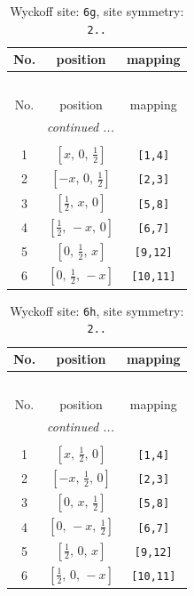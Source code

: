 \documentclass[fleqn,8pt]{jsarticle}
\begin{document}
\renewcommand{\arraystretch}{1.2}
\begin{longtable}{ccc}
\caption{Wyckoff site: {\tt 6g}, site symmetry: {\tt 2..}}
 \\
 \hline \hline
No. & position & mapping \\ \hline \endfirsthead

\multicolumn{2}{l}{\tablename\ \thetable{}} \\
 \hline \hline
No. & position & mapping \\ \hline \endhead

 \hline \hline
\multicolumn{2}{r}{\footnotesize\it continued ...} \\ \endfoot

 \hline \hline
\multicolumn{2}{r}{} \\ \endlastfoot

1 & $\left[ x,\, 0,\, \frac{1}{2} \right]$ & {\tt [1,4]} \\ \hline
2 & $\left[ - x,\, 0,\, \frac{1}{2} \right]$ & {\tt [2,3]} \\ \hline
3 & $\left[ \frac{1}{2},\, x,\, 0 \right]$ & {\tt [5,8]} \\ \hline
4 & $\left[ \frac{1}{2},\, - x,\, 0 \right]$ & {\tt [6,7]} \\ \hline
5 & $\left[ 0,\, \frac{1}{2},\, x \right]$ & {\tt [9,12]} \\ \hline
6 & $\left[ 0,\, \frac{1}{2},\, - x \right]$ & {\tt [10,11]} \\
\end{longtable}
\renewcommand{\arraystretch}{1.2}
\begin{longtable}{ccc}
\caption{Wyckoff site: {\tt 6h}, site symmetry: {\tt 2..}}
 \\
 \hline \hline
No. & position & mapping \\ \hline \endfirsthead

\multicolumn{2}{l}{\tablename\ \thetable{}} \\
 \hline \hline
No. & position & mapping \\ \hline \endhead

 \hline \hline
\multicolumn{2}{r}{\footnotesize\it continued ...} \\ \endfoot

 \hline \hline
\multicolumn{2}{r}{} \\ \endlastfoot

1 & $\left[ x,\, \frac{1}{2},\, 0 \right]$ & {\tt [1,4]} \\ \hline
2 & $\left[ - x,\, \frac{1}{2},\, 0 \right]$ & {\tt [2,3]} \\ \hline
3 & $\left[ 0,\, x,\, \frac{1}{2} \right]$ & {\tt [5,8]} \\ \hline
4 & $\left[ 0,\, - x,\, \frac{1}{2} \right]$ & {\tt [6,7]} \\ \hline
5 & $\left[ \frac{1}{2},\, 0,\, x \right]$ & {\tt [9,12]} \\ \hline
6 & $\left[ \frac{1}{2},\, 0,\, - x \right]$ & {\tt [10,11]} \\
\end{longtable}
\end{document}
